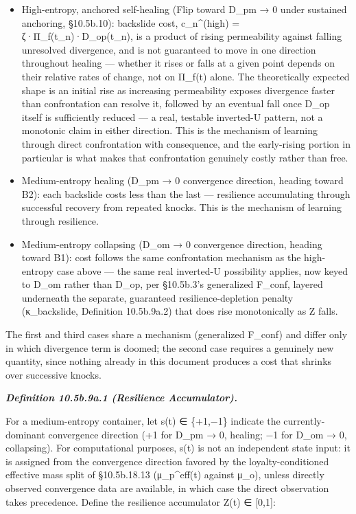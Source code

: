 \documentclass[
]{article}
\begin{document}
\begin{itemize}
\item
  High-entropy, anchored self-healing (Flip toward D\_pm → 0 under
  sustained anchoring, §10.5b.10): backslide cost, c\_n\^{}(high) =
  ζ·Π\_f(t\_n)·D\_op(t\_n), is a product of rising permeability against
  falling unresolved divergence, and is not guaranteed to move in one
  direction throughout healing --- whether it rises or falls at a given
  point depends on their relative rates of change, not on Π\_f(t) alone.
  The theoretically expected shape is an initial rise as increasing
  permeability exposes divergence faster than confrontation can resolve
  it, followed by an eventual fall once D\_op itself is sufficiently
  reduced --- a real, testable inverted-U pattern, not a monotonic claim
  in either direction. This is the mechanism of learning through direct
  confrontation with consequence, and the early-rising portion in
  particular is what makes that confrontation genuinely costly rather
  than free.
\item
  Medium-entropy healing (D\_pm → 0 convergence direction, heading
  toward B2): each backslide costs less than the last --- resilience
  accumulating through successful recovery from repeated knocks. This is
  the mechanism of learning through resilience.
\item
  Medium-entropy collapsing (D\_om → 0 convergence direction, heading
  toward B1): cost follows the same confrontation mechanism as the
  high-entropy case above --- the same real inverted-U possibility
  applies, now keyed to D\_om rather than D\_op, per §10.5b.3's
  generalized F\_conf, layered underneath the separate, guaranteed
  resilience-depletion penalty (κ\_backslide, Definition 10.5b.9a.2)
  that does rise monotonically as Z falls.
\end{itemize}

The first and third cases share a mechanism (generalized F\_conf) and
differ only in which divergence term is doomed; the second case requires
a genuinely new quantity, since nothing already in this document
produces a cost that shrinks over successive knocks.

\emph{\textbf{Definition 10.5b.9a.1 (Resilience Accumulator).}}

For a medium-entropy container, let s(t) ∈ \{+1,−1\} indicate the
currently-dominant convergence direction (+1 for D\_pm → 0, healing; −1
for D\_om → 0, collapsing). For computational purposes, s(t) is not an
independent state input: it is assigned from the convergence direction
favored by the loyalty-conditioned effective mass split of §10.5b.18.13
(μ\_p\^{}eff(t) against μ\_o), unless directly observed convergence data
are available, in which case the direct observation takes precedence.
Define the resilience accumulator Z(t) ∈ {[}0,1{]}:
\end{document}
